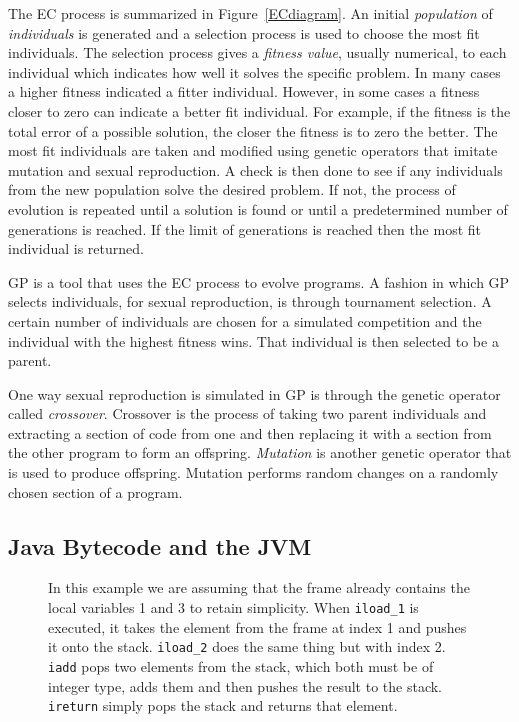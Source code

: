 \documentclass{sig-alternate}
\begin{document}
The EC process is summarized in Figure~\ref{ECdiagram}. An initial \textit{population} of \textit{individuals} is generated and a selection process is used to choose the most fit individuals. The selection process gives a \textit{fitness value}, usually numerical, to each individual which indicates how well it solves the specific problem. In many cases a higher fitness indicated a fitter individual. However, in some cases a fitness closer to zero can indicate a better fit individual. For example, if the fitness  is the total error of a possible solution, the closer the fitness is to zero the better. The most fit individuals are taken and modified using genetic operators that imitate mutation and sexual reproduction. A check is then done to see if any individuals from the new population solve the desired problem. If not, the process of evolution is repeated until a solution is found or until a predetermined number of generations is reached. If the limit of generations is reached then the most fit individual is returned.\par

	GP is a tool that uses the EC process to evolve programs. A fashion in which GP selects individuals, for sexual reproduction, is through tournament selection. A certain number of individuals are chosen for a simulated competition and the individual with the highest fitness wins. That individual is then selected to be a parent.\par 
		
	One way sexual reproduction is simulated in GP is through the genetic operator called \textit{crossover}. Crossover is the process of taking two parent individuals and extracting a section of code from one and then replacing it with a section from the other program to form an offspring. \textit{Mutation} is another genetic operator that is used to produce offspring. Mutation performs random changes on a randomly chosen section of a program.


\subsection{Java Bytecode and the JVM}

\begin{figure}
\centering
{}

\caption{In this example we are assuming that the frame already contains the local variables 1 and 3 to retain simplicity. When \texttt{iload\_1} is executed, it takes the element from the frame at index 1 and pushes it onto the stack. \texttt{iload\_2} does the same thing but with index 2. \texttt{iadd} pops two elements from the stack, which both must be of integer type, adds them and then pushes the result to the stack. \texttt{ireturn} simply pops the stack and returns that element.}
\label{stack}
\end{figure}
\end{document}
